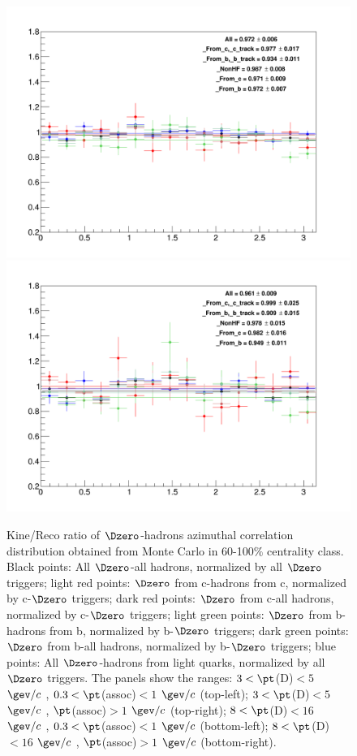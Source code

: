 \begin{figure}
{\includegraphics[width=.48\linewidth]{figuresVsCent/Global/MCClosure/60100/MCClosure_Dzero_Canvas_PtIntBins12to12_PoolInt_thr03to99.png}}
{\includegraphics[width=.48\linewidth]{figuresVsCent/Global/MCClosure/60100/MCClosure_Dzero_Canvas_PtIntBins12to12_PoolInt_thr1to99.png}}
\caption{Kine/Reco ratio of $\Dzero$-hadrons azimuthal correlation distribution obtained from Monte Carlo in 60-100$\%$ centrality class. Black points: All $\Dzero$-all hadrons, normalized by all $\Dzero$ triggers; light red points: $\Dzero$ from c-hadrons from c, normalized by c-$\Dzero$ triggers; dark red points: $\Dzero$ from c-all hadrons, normalized by c-$\Dzero$ triggers; light green points: $\Dzero$ from b-hadrons from b, normalized by b-$\Dzero$ triggers; dark green points: $\Dzero$ from b-all hadrons, normalized by b-$\Dzero$ triggers; blue points: All $\Dzero$-hadrons from light quarks, normalized by all $\Dzero$ triggers.
The panels show the ranges: $3 < \pt$(D)$ < 5$ $\gev/c$ , $0.3 < \pt$(assoc)$ < 1$ $\gev/c$  (top-left); $3 < \pt$(D)$ < 5$ $\gev/c$ , $\pt$(assoc)$ > 1$ $\gev/c$  (top-right); $8 < \pt$(D)$ < 16$ $\gev/c$ , $0.3 < \pt$(assoc)$ < 1$ $\gev/c$  (bottom-left); $8 < \pt$(D)$ < 16$ $\gev/c$ , $\pt$(assoc)$ > 1$ $\gev/c$  (bottom-right).}
\label{fig:MC_Kine_60100}
\end{figure}

